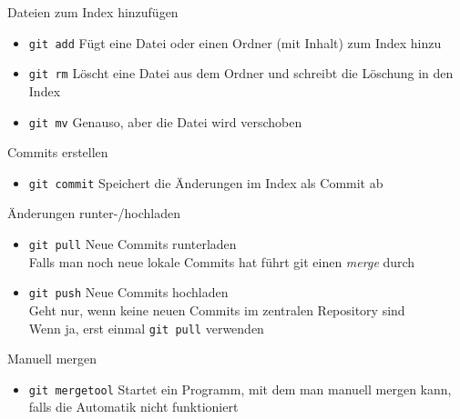 \begin{frame}{Dateien zum Index hinzufügen}
  \begin{itemize}
    \item \texttt{git add} Fügt eine Datei oder einen Ordner (mit Inhalt) zum Index hinzu
    \item \texttt{git rm}  Löscht eine Datei aus dem Ordner und schreibt die Löschung in den Index
    \item \texttt{git mv}  Genauso, aber die Datei wird verschoben
  \end{itemize}
\end{frame}

\begin{frame}{Commits erstellen}
  \begin{itemize}
    \item \texttt{git commit} Speichert die Änderungen im Index als Commit ab
  \end{itemize}
\end{frame}

\begin{frame}{Änderungen runter-/hochladen}
  \begin{itemize}
    \item \texttt{git pull} Neue Commits runterladen\\
                            Falls man noch neue lokale Commits hat führt git einen \textit{merge} durch
    \item \texttt{git push} Neue Commits hochladen\\
                            Geht nur, wenn keine neuen Commits im zentralen Repository sind\\
                            Wenn ja, erst einmal \texttt{git pull} verwenden
  \end{itemize}
\end{frame}

\begin{frame}{Manuell mergen}
  \begin{itemize}
    \item \texttt{git mergetool} Startet ein Programm, mit dem man manuell mergen kann, falls die Automatik nicht funktioniert
  \end{itemize}
\end{frame}
